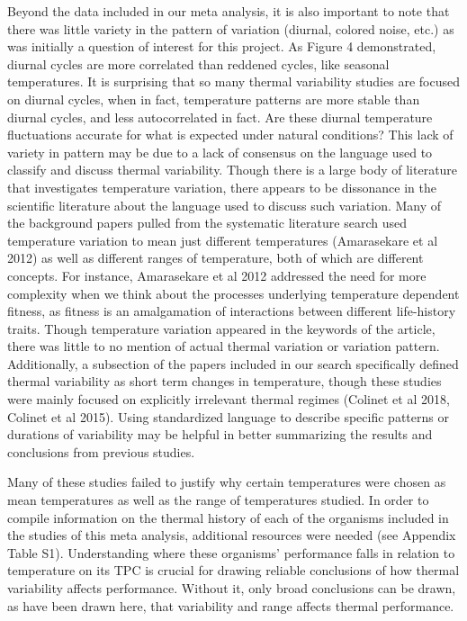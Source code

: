 \documentclass[12pt,twoside]{reedthesis}
\begin{document}
Beyond the data included in our meta analysis, it is also important to note that there was little variety in the pattern of variation (diurnal, colored noise, etc.) as was initially a question of interest for this project. As Figure 4 demonstrated, diurnal cycles are more correlated than reddened cycles, like seasonal temperatures. It is surprising that so many thermal variability studies are focused on diurnal cycles, when in fact, temperature patterns are more stable than diurnal cycles, and less autocorrelated in fact. Are these diurnal temperature fluctuations accurate for what is expected under natural conditions? This lack of variety in pattern may be due to a lack of consensus on the language used to classify and discuss thermal variability. Though there is a large body of literature that investigates temperature variation, there appears to be dissonance in the scientific literature about the language used to discuss such variation. Many of the background papers pulled from the systematic literature search used temperature variation to mean just different temperatures (Amarasekare et al 2012) as well as different ranges of temperature, both of which are different concepts. For instance, Amarasekare et al 2012 addressed the need for more complexity when we think about the processes underlying temperature dependent fitness, as fitness is an amalgamation of interactions between different life-history traits. Though temperature variation appeared in the keywords of the article, there was little to no mention of actual thermal variation or variation pattern. Additionally, a subsection of the papers included in our search specifically defined thermal variability as short term changes in temperature, though these studies were mainly focused on explicitly irrelevant thermal regimes (Colinet et al 2018, Colinet et al 2015). Using standardized language to describe specific patterns or durations of variability may be helpful in better summarizing the results and conclusions from previous studies.

Many of these studies failed to justify why certain temperatures were chosen as mean temperatures as well as the range of temperatures studied. In order to compile information on the thermal history of each of the organisms included in the studies of this meta analysis, additional resources were needed (see Appendix Table S1). Understanding where these organisms' performance falls in relation to temperature on its TPC is crucial for drawing reliable conclusions of how thermal variability affects performance. Without it, only broad conclusions can be drawn, as have been drawn here, that variability and range affects thermal performance.
\end{document}
